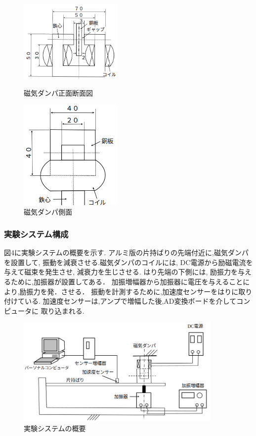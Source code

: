 \documentclass[a4paper,10.5pt]{jsarticle}
\begin{document}
\begin{figure}[h]
  \begin{minipage}{0.5\hsize}
   \begin{center}
    \includegraphics[width=5cm]{2.png}
   \end{center}
   \caption{磁気ダンパ正面断面図}
   \label{fig:one}
  \end{minipage}
  \begin{minipage}{0.5\hsize}
   \begin{center}
    \includegraphics[width=5cm]{3.png}
   \end{center}
   \caption{磁気ダンパ側面}
   \label{fig:two}
  \end{minipage}
\end{figure}  

\subsubsection{実験システム構成}
図4に実験システムの概要を示す. 
アルミ版の片持ばりの先端付近に,磁気ダンパを設置して,
振動を減衰させる.磁気ダンパのコイルには,
DC電源から励磁電流を与えて磁束を発生させ,
減衰力を生じさせる. はり先端の下側には,
励振力を与えるために,加振器が設置してある．
加振増幅器から加振器に電圧を与えることにより,励振力を発．させる．
振動を計測するために,加速度センサーをはりに取り付けている. 
加速度センサーは,アンプで増幅した後,AD変換ボードを介してコンピュータに
取り込まれる.
\newpage

\begin{figure}[h]
  \centering
  \includegraphics[width=10cm]{4.png}
  \caption{実験システムの概要}
\end{figure}
\end{document}
